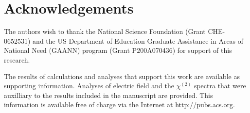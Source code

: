 \section{Acknowledgements}

The authors wish to thank the National Science Foundation (Grant CHE-0652531) and the US Department of Education Graduate Assistance in Areas of National Need (GAANN) program (Grant P200A070436) for support of this research.

The results of calculations and analyses that support this work are available as supporting information. Analyses of electric field and the $\chi^{(2)}$ spectra that were auxilliary to the results included in the manuscript are provided. This information is available free of charge via the Internet at http://pubs.acs.org.
